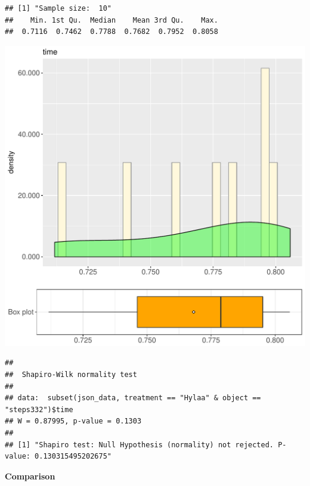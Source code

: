 \documentclass{article}\usepackage[]{graphicx}\usepackage[]{color}
\makeatletter
\def\maxwidth{ %
  \ifdim\Gin@nat@width>\linewidth
    \linewidth
  \else
    \Gin@nat@width
  \fi
}
\newenvironment{kframe}{%
 \def\at@end@of@kframe{}%
 \ifinner\ifhmode%
  \def\at@end@of@kframe{\end{minipage}}%
  \begin{minipage}{\columnwidth}%
 \fi\fi%
 \def\FrameCommand##1{\hskip\@totalleftmargin \hskip-\fboxsep
 \colorbox{shadecolor}{##1}\hskip-\fboxsep
     \hskip-\linewidth \hskip-\@totalleftmargin \hskip\columnwidth}%
 \MakeFramed {\advance\hsize-\width
   \@totalleftmargin\z@ \linewidth\hsize
   \@setminipage}}%
 {\par\unskip\endMakeFramed%
 \at@end@of@kframe}
\newenvironment{knitrout}{}{} %
\makeatother
\begin{document}
\begin{knitrout}
\color{fgcolor}\begin{kframe}
\begin{verbatim}
## [1] "Sample size:  10"
##    Min. 1st Qu.  Median    Mean 3rd Qu.    Max. 
##  0.7116  0.7462  0.7788  0.7682  0.7952  0.8058
\end{verbatim}
\end{kframe}
\includegraphics[width=\maxwidth]{figure/RH2_Hylaa_steps332-1} 
\begin{kframe}\begin{verbatim}
## 
## 	Shapiro-Wilk normality test
## 
## data:  subset(json_data, treatment == "Hylaa" & object == "steps332")$time
## W = 0.87995, p-value = 0.1303
## 
## [1] "Shapiro test: Null Hypothesis (normality) not rejected. P-value: 0.130315495202675"
\end{verbatim}
\end{kframe}
\end{knitrout}
  
 \textbf{Comparison}
  
\end{document}
